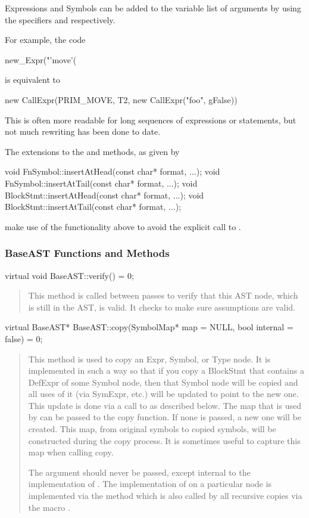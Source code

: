 \documentclass[10pt]{article}
\begin{document}
Expressions and Symbols can be added to the variable list of arguments
by using the specifiers  and  respectively.

For example, the code
\begin{clang}
new_Expr("'move'(%
\end{clang}
is equivalent to
\begin{clang}
new CallExpr(PRIM_MOVE, T2, new CallExpr("foo", gFalse))
\end{clang}
This is often more readable for long sequences of expressions or
statements, but not much rewriting has been done to date.

The extensions to the  and  methods,
as given by
\begin{clang}
void FnSymbol::insertAtHead(const char* format, ...);
void FnSymbol::insertAtTail(const char* format, ...);
void BlockStmt::insertAtHead(const char* format, ...);
void BlockStmt::insertAtTail(const char* format, ...);
\end{clang}
make use of the  functionality above to avoid the
explicit call to .

\subsubsection{BaseAST Functions and Methods}

\begin{clang}
virtual void BaseAST::verify() = 0;
\end{clang}
\begin{quote}
This method is called between passes to verify that this AST node,
which is still in the AST, is valid.  It checks to make sure
assumptions are valid.
\end{quote}

\begin{clang}
virtual BaseAST* BaseAST::copy(SymbolMap* map = NULL, bool internal = false) = 0;
\end{clang}
\begin{quote}
This method is used to copy an Expr, Symbol, or Type node.  It is
implemented in such a way so that if you copy a BlockStmt that
contains a DefExpr of some Symbol node, then that Symbol node will be
copied and all uses of it (via SymExpr, etc.) will be updated to point
to the new one.  This update is done via a call to 
as described below.  The map that is used by  can
be passed to the copy function.  If none is passed, a new one will be
created.  This map, from original symbols to copied symbols, will be
constructed during the copy process.  It is sometimes useful to
capture this map when calling copy.

The argument  should never be passed, except internal to
the implementation of .  The implementation of  on a
particular node is implemented via the method  which is
also called by all recursive copies via the macro .
\end{quote}
\end{document}
